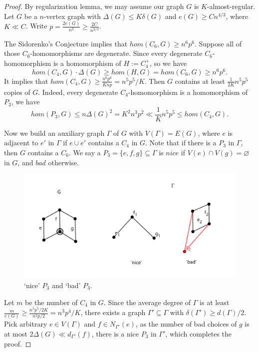 \documentclass{article}
\theoremstyle{definition}
\begin{document}
\begin{proof}
By regularization lemma, we may assume our graph $G$ is $K$-almost-regular. Let $G$ be a $n$-vertex graph with $\Delta(G)\leq K\delta(G)$ and $e(G)\geq Cn^{4/3}$, where $K\ll C$. Write $p=\frac{2e(G)}{n^2}\geq \frac{2C}{n^{2/3}}$.

The Sidorenko's Conjecture implies that $hom(C_6,G)\geq n^6 p^6$. Suppose all of those $C_6$-homomorphisms are degenerate. Since every degenerate $C_6$-homomorphism is a homomorphism of $H:=C_4^+$, so we have $$hom(C_4,G)\cdot \Delta(G)\geq hom(H,G)=hom(C_6,G)\geq n^6p^6.$$ 
It implies that $hom(C_4,G)\geq \frac{n^6p^6}{Knp}=n^5p^5/K$. Then $G$ contains at least $\frac{1}{2K}n^5p^5$ copies of $G$. Indeed, every degenerate $C_4$-homomorphism is a homomorphism of $P_3$, we have 
$$hom(P_3,G)\leq n\Delta(G)^2= K^2n^3p^2 \ll \frac{1}{K}n^5p^5\leq  hom(C_4,G).$$

Now we build an auxiliary graph $\Gamma$ of $G$ with $V(\Gamma)=E(G)$, where $e$ is adjacent to $e'$ in $\Gamma$ if $e\cup e'$ contains a $C_4$ in $G$. Note that if there is a $P_3$ in $\Gamma$, then $G$ contains a $C_6$. We say a $P_3=\{e,f,g\}\subseteq \Gamma$ is $nice$ if $V(e)\cap V(g)=\varnothing$ in $G$, and $bad$ otherwise.

\begin{figure}[h]
     \centering
     \includegraphics[scale=0.6]{10-2.png}
     \caption{‘nice’ $P_3$ and ‘bad’ $P_3$.}
     \label{10-1}
\end{figure}

Let $m$ be the number of $C_4$ in $G$. Since the average degree of $\Gamma$ is at least $\frac{m}{e(G)}\geq \frac{n^5p^5/2K}{n^2p/2}=n^3p^4/K$, there exists a graph $\Gamma'\subseteq \Gamma$ with $\delta(\Gamma')\geq d(\Gamma)/2$. Pick arbitrary $e\in V(\Gamma)$ and $f\in N_{\Gamma'}(e)$, as the number of bad choices of $g$ is at most $2\Delta(G)\ll d_{\Gamma'}(f)$, there is a nice $P_3$ in $\Gamma'$, which completes the proof.
\end{proof}
\end{document}
